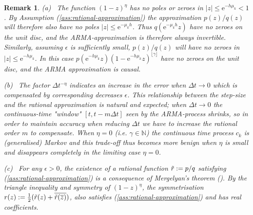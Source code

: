 \documentclass[12pt]{article} %
\newcommand{\abs}[1]{\left| #1 \right|}
\newtheorem{remark}{Remark}
\begin{document}
\begin{remark} (a) \ The function $(1 - z)^{\eta}$ has no poles or zeroes in %
$|z| \leq \mathrm{e}^{-h \mu_k} < 1$. %
By Assumption (\ref{ass:rational-approximation}) the approximation $p(z) / q(z)$ will therefore also have no poles $|z| \leq \mathrm{e}^{-\mu_k h}$. Thus 
$q(\mathrm{e}^{- \mu_k h}z)$ have no zeroes on the unit disc, and the ARMA-approximation is therefore always invertible. Similarly, assuming $\epsilon$ is sufficiently small, $p(z
) / q(z)$ will %
have no zeroes in $|z| \leq \mathrm{e}^{-h \mu_k}$. In this case $p(\mathrm{e}^{-h \mu_k}z)(1 - \mathrm{e}^{-h \mu_k}z)^{\lfloor \gamma \rfloor}$ have no zeroes on the unit disc, and the ARMA approximation is causal.


\medskip
\noindent (b) \ The factor $\Delta t^{-\eta}$ indicates an increase in the error when $\Delta t \rightarrow 0$ which is compensated by corresponding decreases $\epsilon$. This relationship between the step-size and the rational approximation is natural and expected; when $\Delta t \rightarrow 0$ the continuous-time "window" $[t, t - m\Delta t]$ seen by the ARMA-process shrinks, so in order to maintain accuracy when reducing $\Delta t$ we have to increase the rational order $m$ to compensate. When $\eta = 0$ (i.e. $\gamma \in \mathbb{N}$) the continuous time process $c_k$ is (generalised) Markov and this trade-off thus becomes more benign when $\eta$ is small and disappears completely in the limiting case $\eta = 0$.

\medskip
\noindent (c) \ \label{rem:existence-of-rational-function} For any $\epsilon > 0$, the existence of a rational function $\Tilde{r} := p/q$ satisfying (\ref{ass:rational-approximation})  is a consequence of Mergelyan's theorem (\cite{Mergelyan1952}). By the triangle inequality and symmetry of $(1 - z)^\eta$, the symmetrisation $r(z) := \frac12(\Tilde{r}(z) + \overline{\Tilde{r}(\overline{z})})$, 
also satisfies (\ref{ass:rational-approximation}) and has real coefficients.

\end{remark}
\end{document}
